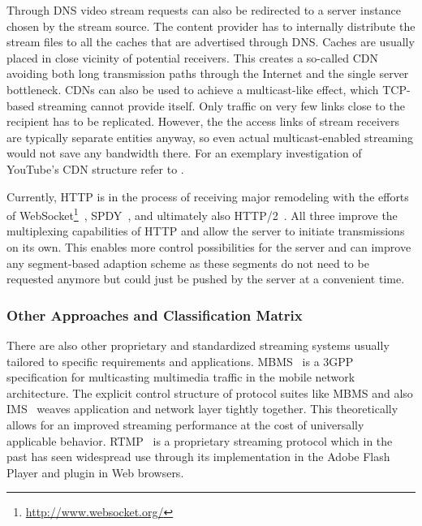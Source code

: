 Through \gls{DNS} video stream requests can also be redirected to a server instance chosen by the stream source. The content provider has to internally distribute the stream files to all the caches that are advertised through \gls{DNS}. Caches are usually placed in close vicinity of potential receivers. This creates a so-called \gls{CDN} avoiding both long transmission paths through the Internet and the single server bottleneck. \glspl{CDN} can also be used to achieve a multicast-like effect, which \gls{TCP}-based streaming cannot provide itself. Only traffic on very few links close to the recipient has to be replicated. However, the the access links of stream receivers are typically separate entities anyway, so even actual multicast-enabled streaming would not save any bandwidth there. For an exemplary investigation of YouTube's \gls{CDN} structure refer to \cite{rafetseder2011explyt}.

Currently, \gls{HTTP} is in the process of receiving major remodeling with the efforts of WebSocket\footnote{\url{http://www.websocket.org/}}~\cite{ietf2011websocket}, SPDY~\cite{google2011SPDYdef,google2010SPDYwp}, and ultimately also HTTP/2~\cite{http20draft}. All three improve the multiplexing capabilities of \gls{HTTP} and allow the server to initiate transmissions on its own. This enables more control possibilities for the server and can improve any segment-based adaption scheme as these segments do not need to be requested anymore but could just be pushed by the server at a convenient time.

\subsubsection{Other Approaches and Classification Matrix}

There are also other proprietary and standardized streaming systems usually tailored to specific requirements and applications. \gls{MBMS}~\cite{3gpp.22.146,3gpp.22.246} is a \gls{3GPP} specification for multicasting multimedia traffic in the mobile network architecture. The explicit control structure of protocol suites like \gls{MBMS} and also \gls{IMS}~\cite{3gpp.23.228} weaves application and network layer tightly together. This theoretically allows for an improved streaming performance at the cost of universally applicable behavior. \gls{RTMP}~\cite{rtmpspec} is a proprietary streaming protocol which in the past has seen widespread use through its implementation in the Adobe Flash Player and plugin in Web browsers. 

